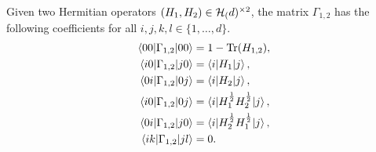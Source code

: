\documentclass[notitlepage, 10pt]{article}
\begin{document}
\begin{exam}
    Given two Hermitian operators $(H_1, H_2) \in \mathcal H_{(}d)^{\times 2}$, the matrix $\Gamma_{1,2}$ has the following coefficients for all $i,j,k,l \in \{1, \ldots, d\}$.
    \begin{align}
        \braket{00|\Gamma_{1,2}|00} &= 1-\operatorname{Tr}(H_{1,2}), \\
        \braket{i0|\Gamma_{1,2}|j0} &= \braket{i|H_{1}|j}, \\
        \braket{0i|\Gamma_{1,2}|0j} &= \braket{i|H_{2}|j}, \\
        \braket{i0|\Gamma_{1,2}|0j} &= \braket{i|H_{1}^{\frac{1}{2}}H_{2}^{\frac{1}{2}}|j}, \\
        \braket{0i|\Gamma_{1,2}|j0} &= \braket{i|H_{2}^{\frac{1}{2}}H_{1}^{\frac{1}{2}}|j}, \\
        \braket{ik|\Gamma_{1,2}|jl} &= 0.
    \end{align}
\end{exam}
\end{document}
